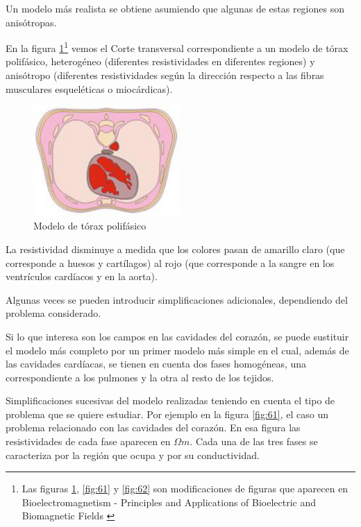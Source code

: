 Un modelo más realista se obtiene asumiendo que algunas de estas regiones son anisótropas.


En la figura \ref{fig:60}\footnote{Las figuras \ref{fig:60}, \ref{fig:61} y \ref{fig:62} son modificaciones de figuras que aparecen en Bioelectromagnetism - Principles and Applications of Bioelectric and Biomagnetic Fields \cite{Malmivuo_1995}} vemos el Corte transversal correspondiente a un modelo de tórax polifásico, heterogéneo (diferentes resistividades en diferentes regiones) y anisótropo (diferentes resistividades según la dirección respecto a las fibras musculares esqueléticas o miocárdicas).

\begin{figure}[H]
    \centering
    \includegraphics[width=0.5\textwidth]{./Figures/fig60}
	\caption{Modelo de tórax polifásico} 
	\label{fig:60}
\end{figure}

La resistividad disminuye a medida que los colores pasan de amarillo claro (que corresponde a huesos y cartílagos) al rojo (que corresponde a la sangre en los ventrículos cardíacos y en la aorta).

Algunas veces se pueden introducir simplificaciones adicionales, dependiendo del problema considerado.

Si lo que interesa son los campos en las cavidades del corazón, se puede sustituir el modelo más completo por un primer modelo más simple en el cual, además de las cavidades cardíacas, se tienen en cuenta dos fases homogéneas, una correspondiente a los pulmones y la otra al resto de los tejidos.

Simplificaciones sucesivas del modelo realizadas teniendo en cuenta el tipo de problema que se quiere estudiar. Por ejemplo en la figura \ref{fig:61}, el caso un problema relacionado con las cavidades del corazón. En esa figura las resistividades de cada fase aparecen en $\Omega m$. Cada una de las tres fases se caracteriza por la región que ocupa y por su conductividad.

